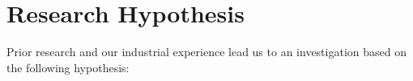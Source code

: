 





\section{Research Hypothesis}
Prior research and our industrial experience lead us to an investigation based on the following hypothesis:
	
